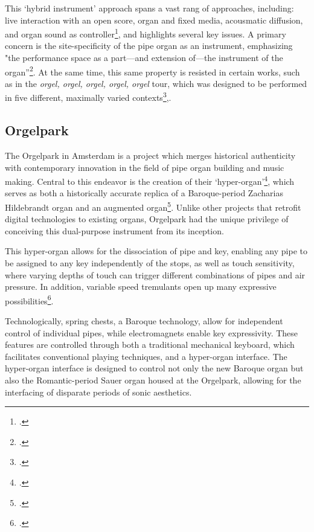 \documentclass[12pt,twoside,maitrise]{dms_ks}
\theoremstyle{definition}
\begin{document}
{This `hybrid instrument' approach spans a vast rang of approaches, including: live interaction with an open score, organ and fixed media, acousmatic diffusion, and organ sound as controller\footcite[345]{redhead_developing_2023}, and highlights several key issues.
A primary concern is the site-specificity of the pipe organ as an instrument, emphasizing "the performance space as a part---and extension of---the instrument of the organ”\footcite[3]{redhead_sound_2014}.
At the same time, this same property is resisted in certain works, such as in the \textit{orgel, orgel, orgel, orgel, orgel} tour, which was designed to be performed in five different, maximally varied contexts\footcite[344--345]{redhead_developing_2023},. 

\subsection{Orgelpark}

The Orgelpark in Amsterdam is a project which merges historical authenticity with contemporary innovation in the field of pipe organ building and music making. 
Central to this endeavor is the creation of their `hyper-organ'\footcite{vrije_geluiden_superabundance_2020}, which serves as both a historically accurate replica of a Baroque-period Zacharias Hildebrandt organ and an augmented organ\footcite[36]{peters_how_2014}. 
Unlike other projects that retrofit digital technologies to existing organs, Orgelpark had the unique privilege of conceiving this dual-purpose instrument from its inception. 

This hyper-organ allows for the dissociation of pipe and key, enabling any pipe to be assigned to any key independently of the stops, as well as touch sensitivity, where varying depths of touch can trigger different combinations of pipes and air pressure.
In addition, variable speed tremulants open up many expressive possibilities\footcite[19--29]{fidom_digital_2014}.

Technologically, spring chests, a Baroque technology, allow for independent control of individual pipes, while electromagnets enable key expressivity. 
These features are controlled through both a traditional mechanical keyboard, which facilitates conventional playing techniques, and a hyper-organ interface. 
The hyper-organ interface is designed to control not only the new Baroque organ but also the Romantic-period Sauer organ housed at the Orgelpark, allowing for the interfacing of disparate periods of sonic aesthetics. 

}
\end{document}
